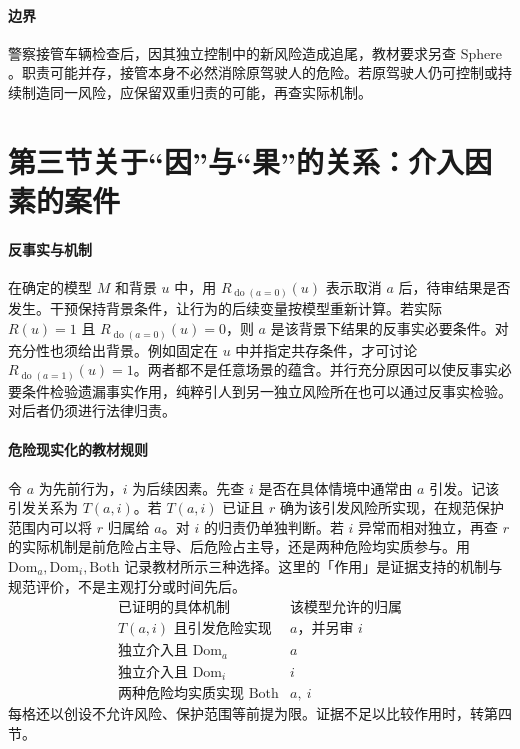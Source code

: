 \paragraph{边界}
警察接管车辆检查后，因其独立控制中的新风险造成追尾，教材要求另查 $\mathrm{Sphere}$。职责可能并存，接管本身不必然消除原驾驶人的危险。若原驾驶人仍可控制或持续制造同一风险，应保留双重归责的可能，再查实际机制。

\section{第三节\quad 关于“因”与“果”的关系：介入因素的案件}

\paragraph{反事实与机制}
在确定的模型 $M$ 和背景 $u$ 中，用 $R_{\operatorname{do}(a=0)}(u)$ 表示取消 $a$ 后，待审结果是否发生。干预保持背景条件，让行为的后续变量按模型重新计算。若实际 $R(u)=1$ 且 $R_{\operatorname{do}(a=0)}(u)=0$，则 $a$ 是该背景下结果的反事实必要条件。对充分性也须给出背景。例如固定在 $u$ 中并指定共存条件，才可讨论 $R_{\operatorname{do}(a=1)}(u)=1$。两者都不是任意场景的蕴含。并行充分原因可以使反事实必要条件检验遗漏事实作用，纯粹引人到另一独立风险所在也可以通过反事实检验。对后者仍须进行法律归责。

\paragraph{危险现实化的教材规则}
令 $a$ 为先前行为，$i$ 为后续因素。先查 $i$ 是否在具体情境中通常由 $a$ 引发。记该引发关系为 $T(a,i)$。若 $T(a,i)$ 已证且 $r$ 确为该引发风险所实现，在规范保护范围内可以将 $r$ 归属给 $a$。对 $i$ 的归责仍单独判断。若 $i$ 异常而相对独立，再查 $r$ 的实际机制是前危险占主导、后危险占主导，还是两种危险均实质参与。用 $\mathrm{Dom}_a,\mathrm{Dom}_i,\mathrm{Both}$ 记录教材所示三种选择。这里的「作用」是证据支持的机制与规范评价，不是主观打分或时间先后。
\[
\begin{array}{c|c}
\text{已证明的具体机制} & \text{该模型允许的归属}\\ \hline
T(a,i)\text{ 且引发危险实现} & a\text{，并另审 }i\\
\text{独立介入且 }\mathrm{Dom}_a & a\\
\text{独立介入且 }\mathrm{Dom}_i & i\\
\text{两种危险均实质实现 }\mathrm{Both} & a,\ i
\end{array}
\]
每格还以创设不允许风险、保护范围等前提为限。证据不足以比较作用时，转第四节。

